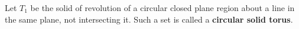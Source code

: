 Let $T_1$ be the solid of revolution of a circular closed plane region about a line in the same plane, not intersecting it. Such a set is called a \textbf{circular solid torus}.
